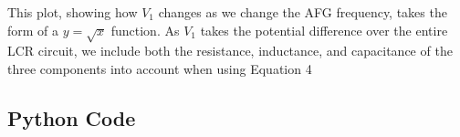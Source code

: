 \documentclass[a4paper]{article}
\begin{document}
This plot, showing how $V_1$ changes as we change the AFG frequency, takes the form of a $y=\sqrt x$ function. As $V_1$ takes the potential difference over the entire LCR circuit, we include both the resistance, inductance, and capacitance of the three components into account when using Equation 4

\begin{appendix}
\section{Python Code}\label{sec:python}

\end{appendix}
\end{document}
